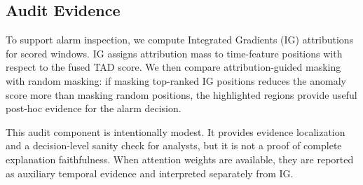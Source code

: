 \subsection{Audit Evidence}

To support alarm inspection, we compute Integrated Gradients (IG) attributions \cite{sundararajan2017axiomatic} for scored windows. IG assigns attribution mass to time-feature positions with respect to the fused TAD score. We then compare attribution-guided masking with random masking: if masking top-ranked IG positions reduces the anomaly score more than masking random positions, the highlighted regions provide useful post-hoc evidence for the alarm decision.

This audit component is intentionally modest. It provides evidence localization and a decision-level sanity check for analysts, but it is not a proof of complete explanation faithfulness. When attention weights are available, they are reported as auxiliary temporal evidence and interpreted separately from IG.
